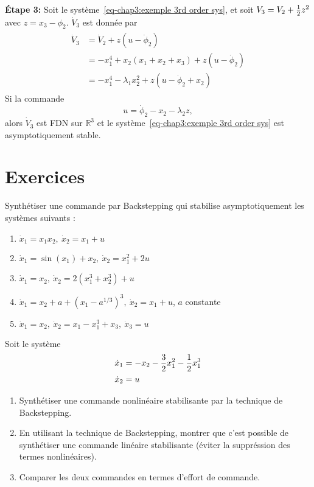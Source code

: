 \begin{example}
   \textbf{Étape 3:} Soit le système~\eqref{eq-chap3:exemple 3rd order sys}, et soit $V_3=V_2 + \frac{1}{2} z^2$ avec $z = x_3-\phi_2$. $\dot{V}_3$ est donnée par 
   \begin{align}
	   	\begin{split}
	   		\dot{V}_3 &= \dot{V}_2 + z\left(u-\dot{\phi}_2\right)\\
	   		&= -x_1^4 + x_2\left(x_1 +x_2 + x_3\right)+ z\left(u-\dot{\phi}_2\right) \\ 
	   		&= -x_1^4 -\lambda_1x_2^2 + z\left(u-\dot{\phi}_2+x_2\right)  
	   	\end{split}
   \end{align}
   Si la commande 
   \begin{equation}
   	u = \dot{\phi}_2-x_2-\lambda_2z,
   \end{equation} 
   alors $\dot{V}_3$ est FDN sur $\mathbb{R}^3$ et le système~\eqref{eq-chap3:exemple 3rd order sys} est asymptotiquement stable.
\end{example}

\newpage
\section{Exercices}
\begin{exercise}
	Synthétiser une commande par Backstepping qui stabilise asymptotiquement les systèmes suivants : 
	\begin{enumerate}
		\item $\dot{x}_1 = x_1x_2, \ \dot{x}_2 = x_1 +u$
		\item $\dot{x}_1 = \sin(x_1)+x_2, \ \dot{x}_2 = x_1^2 +2u$
		\item $\dot{x}_1 = x_2, \ \dot{x}_2 = 2(x_1^3+x_2^3) +u$
		\item $\dot{x}_1 = x_2 + a + (x_1-a^{1/3})^3, \ \dot{x}_2 = x_1 +u$, $a$ constante
		\item $\dot{x}_1 = x_2, \ \dot{x}_2 = x_1 - x_1^3 +x_3, \ \dot{x}_3=u$
	\end{enumerate}
\end{exercise}
\begin{exercise}
	Soit le système 
	\begin{align}
	\begin{split}
		\dot{x}_1 &= -x_2-\frac{3}{2}x_1^2-\frac{1}{2} x_1^3\\
		\dot{x}_2 &=u
	\end{split}
	\end{align}
	\begin{enumerate}
		\item Synthétiser une commande nonlinéaire stabilisante par la technique de Backstepping.
		\item En utilisant la technique de Backstepping, montrer que c'est possible de synthétiser une commande linéaire stabilisante (éviter la suppréssion des termes nonlinéaires).
		\item Comparer les deux commandes en termes d'effort de commande.
	\end{enumerate}
\end{exercise}

